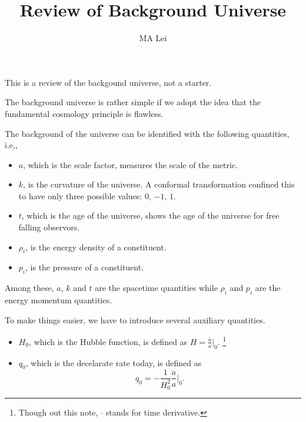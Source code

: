 \documentclass{article}
\begin{document}
\title{Review of Background Universe}
\author{MA Lei}
\maketitle






This is a review of the backgound universe, not a starter.


The background universe is rather simple if we adopt the idea that the fundamental cosmology principle is flawless.

The background of the universe can be identified with the following quantities, i.e,,

\begin{itemize}
\item
$a$, which is the scale factor, measures the scale of the metric.

\item
$k$, is the curvature of the universe. A conformal transformation confined this to have only three possible values: $0$, $-1$, $1$.

\item
$t$, which is the age of the universe, shows the age of the universe for free falling observors.

\item
$\rho_i$, is the energy density of a constituent.

\item
$p_i$, is the pressure of a constituent.

\end{itemize}

Among these, $a$, $k$ and $t$ are the spacetime quantities while $\rho_i$ and $p_i$ are the energy momentum quantities.

To make things easier, we have to introduce several auxiliary quantities.

\begin{itemize}
\item
$H_0$, which is the Hubble function, is defined as $H=\frac{\dot a}{a} |_0$. \footnote{Though out this note, $\cdot$ stands for time derivative.}

\item
$q_0$, which is the decelarate rate today, is defined as
\begin{equation}q_0=-\frac{1}{H_0^2}\frac{\ddot a}{a}|_0    .\end{equation}
\end{itemize}
\end{document}
